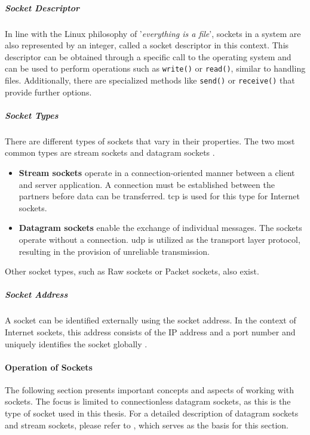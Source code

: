 \subparagraph{Socket Descriptor}
In line with the Linux philosophy of '\textit{everything is a file}', sockets in a system are also represented by an integer, called a socket descriptor in this context. This descriptor can be obtained through a specific call to the operating system and can be used to perform operations such as \texttt{write()} or \texttt{read()}, similar to handling files. Additionally, there are specialized methods like \texttt{send()} or \texttt{receive()} that provide further options.

\subparagraph{Socket Types}
There are different types of sockets that vary in their properties. The two most common types are stream sockets and datagram sockets \cite{like03}.

\begin{itemize}
\item \textbf{Stream sockets} operate in a connection-oriented manner between a client and server application. A connection must be established between the partners before data can be transferred. \ac{tcp} is used for this type for Internet sockets.
\item \textbf{Datagram sockets} enable the exchange of individual messages. The sockets operate without a connection. \ac{udp} is utilized as the transport layer protocol, resulting in the provision of unreliable transmission.
\end{itemize}

Other socket types, such as Raw sockets or Packet sockets, also exist.


\subparagraph{Socket Address}
A socket can be identified externally using the socket address. In the context of Internet sockets, this address consists of the IP address and a port number and uniquely identifies the socket globally \cite{sock02}.


\paragraph{Operation of Sockets}

The following section presents important concepts and aspects of working with sockets. The focus is limited to connectionless datagram sockets, as this is the type of socket used in this thesis. For a detailed description of datagram sockets and stream sockets, please refer to \cite{like03}, which serves as the basis for this section.

